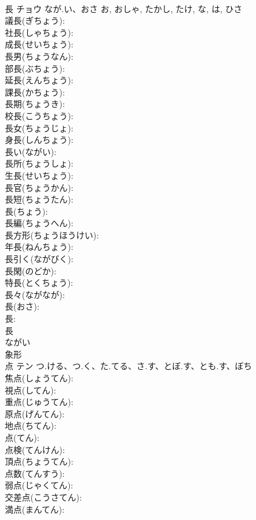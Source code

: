 \documentclass[8pt]{extreport}
\begin{document}
\begin{CJK}{UTF8}{min}
\\	長	チョウ	なが.い、おさ	お, おしゃ, たかし, たけ, な, は, ひさ	
\\	議長(ぎちょう): 
\\	社長(しゃちょう): 
\\	成長(せいちょう): 
\\	長男(ちょうなん): 
\\	部長(ぶちょう): 
\\	延長(えんちょう): 
\\	課長(かちょう): 
\\	長期(ちょうき): 
\\	校長(こうちょう): 
\\	長女(ちょうじょ): 
\\	身長(しんちょう): 
\\	長い(ながい): 
\\	長所(ちょうしょ): 
\\	生長(せいちょう): 
\\	長官(ちょうかん): 
\\	長短(ちょうたん): 
\\	長(ちょう): 
\\	長編(ちょうへん): 
\\	長方形(ちょうほうけい): 
\\	年長(ねんちょう): 
\\	長引く(ながびく): 
\\	長閑(のどか): 
\\	特長(とくちょう): 
\\	長々(ながなが): 
\\	長(おさ): 
\\	長: 
\\	長	
\\	ながい	
\\	象形 
\\	点	テン	つ.ける、つ.く、た.てる、さ.す、とぼ.す、とも.す、ぼち		
\\	焦点(しょうてん): 
\\	視点(してん): 
\\	重点(じゅうてん): 
\\	原点(げんてん): 
\\	地点(ちてん): 
\\	点(てん): 
\\	点検(てんけん): 
\\	頂点(ちょうてん): 
\\	点数(てんすう): 
\\	弱点(じゃくてん): 
\\	交差点(こうさてん): 
\\	満点(まんてん): 

\end{CJK}
\end{document}
